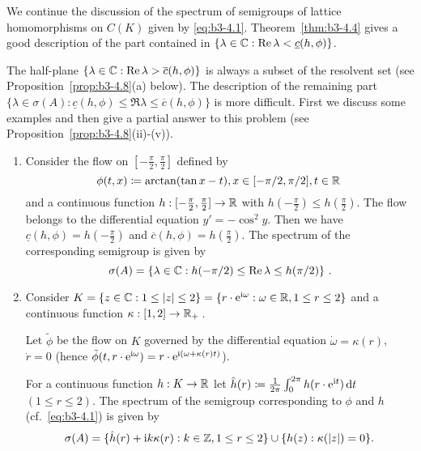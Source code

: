 We continue the discussion of the spectrum of semigroups of lattice homomorphisms on $C(K)$ given by \eqref{eq:b3-4.1}.
Theorem~\ref{thm:b3-4.4} gives a good description of the part contained in $\{\lambda \in \mathbb{C} : \mathop{}\!\mathrm{Re}\,\lambda < \underline{c}(h,\phi)\}$.

The half-plane $\{\lambda \in \mathbb{C} : \mathop{}\!\mathrm{Re}\,\lambda > \overline{c}(h,\phi)\}$ is always a subset of the resolvent set (see Proposition~\ref{prop:b3-4.8}(a) below).
The description of the remaining part $\{\lambda \in \sigma(A) : \underline{c}(h,\phi) \leq \Re\lambda \leq \overline{c}(h,\phi)\}$ is more difficult.
First we discuss some examples and then give a partial answer to this problem (see Proposition~\ref{prop:b3-4.8}(ii)-(v)).

\begin{example}\label{ex:b3-4.7}
	\begin{enumerate}[\upshape (i), wide, labelindent=.5em]
		\item 
		Consider the flow on $[-\frac{\pi}{2},\frac{\pi}{2}]$ defined by
		\[
		\phi(t,x)\coloneq \arctan(\tan x - t) , x \in [-{\pi}/{2},{\pi}/{2}], 
		t \in \mathbb{R}\
		\] 
		and a continuous function $h : [-\frac{\pi}{2},\frac{\pi}{2}] \to \mathbb{R}$ with $h(-\frac{\pi}{2}) \leq h(\frac{\pi}{2})$. The flow belongs to the differential equation $y' = -\cos^2y$. 
		Then we have $\underline{c}(h,\phi) = h(-\frac{\pi}{2})$ and $\overline{c}(h,\phi) = h(\frac{\pi}{2})$.
		The spectrum of the corresponding semigroup is given by 
		\[
		\sigma(A) = \left\{\lambda \in \mathbb{C} : h(-\pi/2) \leq \mathop{}\!\mathrm{Re}\,\lambda \leq h(\pi/2)\right\}\,.
		\]
		
		\item 
		Consider $K = \{z \in \mathbb{C} : 1 \leq |z| \leq 2\} = \{r\cdot \mathrm{e}^{\mathcal{\mathrm{i}\omega}} : \omega\in \mathbb{R}, 1 \leq r \leq 2\}$ and a continuous function $\kappa: [1,2] \to \mathbb{R}_+$\,.
		
		Let $\tilde{\phi}$ be the flow on $K$ governed by the differential equation $\dot{\omega} = \kappa(r)$, $\dot{r} = 0$ (hence $\tilde{\phi}(t,r\cdot \mathrm{e}^{\mathrm{i}\omega}) = r\cdot \mathrm{e}^{\mathrm{i}(\omega + \kappa(r)t)}$).
		
		For a continuous function $h: K \to \mathbb{R}$ let $\hat{h}(r) \coloneq \frac{1}{2\pi}\int_{0}^{2\pi} h(r\cdot \mathrm{e}^{\mathrm{i} t}) \mathop{}\!\mathrm{d}{t}$ $(1 \leq r \leq 2)$.
		The spectrum of the semigroup corresponding to $\phi$ and $h$ (cf.\ \eqref{eq:b3-4.1}) is given by
		\[
		\sigma(A) = \{\hat{h}(r) +  \mathrm{i} k\kappa(r) : k \in \mathbb{Z}, 1 \leq r \leq 2\} \cup \{h(z) : \kappa(|z|) = 0\}.
		\]
	\end{enumerate}
\end{example}

